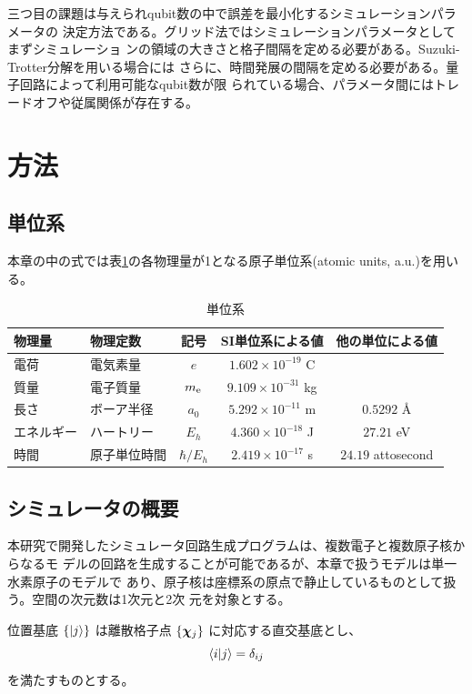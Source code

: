 \documentclass[fontsize=11pt]{jlreq}
\begin{document}
三つ目の課題は与えられqubit数の中で誤差を最小化するシミュレーションパラメータの
決定方法である。グリッド法ではシミュレーションパラメータとしてまずシミュレーショ
ンの領域の大きさと格子間隔を定める必要がある。Suzuki-Trotter分解を用いる場合には
さらに、時間発展の間隔を定める必要がある。量子回路によって利用可能なqubit数が限
られている場合、パラメータ間にはトレードオフや従属関係が存在する。

\section{方法}
\subsection{単位系}

本章の中の式では表\ref{tab:unit-system}の各物理量が1となる原子単位系(atomic units, a.u.)を用いる。

\begin{table}[ht]
    \centering
    \begin{tabular}{llccc}
        物理量 & 物理定数 & 記号 & SI単位系による値 & 他の単位による値 \\
        \hline
        電荷 & 電気素量 & $e$ & $1.602\times10^{-19}$ C \\
        質量 & 電子質量 & $m_{\mathrm{e}}$ & $9.109\times10^{-31}$ kg \\
        長さ & ボーア半径 & $a_0$ & $5.292\times10^{-11}$ m & $0.5292$ \AA \\
        エネルギー & ハートリー & $E_h$ & $4.360\times10^{-18}$ J & $27.21$ eV \\
        時間 & 原子単位時間 & $\hbar/E_h$ & $2.419\times10^{-17}$ s & $24.19$ attosecond \\
    \end{tabular}
    \caption{単位系}
    \label{tab:unit-system}
\end{table}


\subsection{シミュレータの概要}

本研究で開発したシミュレータ回路生成プログラムは、複数電子と複数原子核からなるモ
デルの回路を生成することが可能であるが、本章で扱うモデルは単一水素原子のモデルで
あり、原子核は座標系の原点で静止しているものとして扱う。空間の次元数は1次元と2次
元を対象とする。

位置基底 $\{\ket{j}\}$ は離散格子点 $\{\bm{\chi}_{j}\}$ に対応する直交基底とし、
\begin{equation}
\braket{i|j}=\delta_{ij}
\end{equation}
を満たすものとする。
\end{document}
